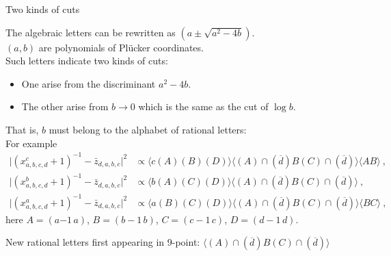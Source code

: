 \documentclass[10pt]{beamer}
\begin{document}
\begin{frame}{Two kinds of cuts}
  
  The algebraic letters can be rewritten as $(a\pm \sqrt{a^{2}-4b})$.\\
  $(a,b)$ are polynomials of Pl\"{u}cker coordinates. \\
  Such letters indicate two kinds of cuts:
  \begin{itemize}
    \item One arise from the discriminant $a^{2}-4b$.
    \item The other arise from $b\to0$ which is the same as the cut of $\log b$. 
  \end{itemize}
That is, $b$ must belong to the alphabet of \alert{rational letters}:\\
For example {\footnotesize{
\begin{equation*}
  \begin{aligned}
  \bigl|(x^{c}_{a,b,c,d}+1)^{-1}-\bar{z}_{d,a,b,c}\bigr|^{2}&\propto\langle c(A)(B)(D)\rangle\langle(A) \cap(\overline{d}) B(C) \cap(\overline{d})\rangle\langle A B\rangle \:,\\
  \bigl|(x^{b}_{a,b,c,d}+1)^{-1}-\bar{z}_{d,a,b,c}\bigr|^{2}&\propto \langle b(A)(C)(D)\rangle\langle(A) \cap(\overline{d}) B(C) \cap(\overline{d})\rangle \:, \\
  \bigl|(x^{a}_{a,b,c,d}+1)^{-1}-\bar{z}_{d,a,b,c}\bigr|^{2}&\propto \langle a(B)(C)(D)\rangle\langle(A) \cap(\overline{d}) B(C) \cap(\overline{d})\rangle\langle B C\rangle \:,
  \end{aligned} 
\end{equation*}
}}
here $A=(a{-1}\,a)$, $B=(b{-}1\,b)$, $C=(c{-}1\,c)$, $D=(d{-}1\,d)$.

New rational letters first appearing in 9-point: $\langle(A) \cap(\overline{d}) B(C) \cap(\overline{d})\rangle$
\end{frame}
\end{document}
